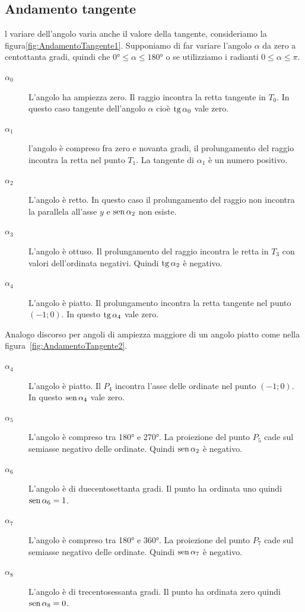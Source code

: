 \subsection{Andamento tangente}
\label{sec:AndamentoTangente}
l variare dell'angolo varia anche il valore della tangente, consideriamo la figura\nobs\vref{fig:AndamentoTangente1}. Supponiamo di far variare l'angolo $\alpha$ da zero a centottanta gradi, quindi che $\ang{0}\leq\alpha\leq\ang{180}$ o se utilizziamo i radianti $0\leq\alpha\leq\pi$. 
\begin{description}
	\item[$\alpha_0$] L'angolo ha ampiezza zero. Il raggio incontra la retta tangente in  $T_0$. In questo caso  tangente  dell'angolo $\alpha$ cioè $\operatorname{tg}\alpha_0$ vale zero.
	\item [$\alpha_1$] l'angolo è compreso fra zero e novanta gradi, il prolungamento del raggio  incontra la retta nel punto $T_1$. La tangente di $\alpha_1$ è un numero positivo.
	\item [$\alpha_2$] L'angolo  è retto. In questo caso il prolungamento del raggio non incontra la parallela all'asse $y$  e  $\operatorname{sen}\alpha_2$ non esiste. 
	\item [$\alpha_3$]  L'angolo è ottuso. Il prolungamento del raggio incontra le retta in $T_3$  con valori dell'ordinata negativi. Quindi $\operatorname{tg}\alpha_2$ è negativo.
	\item [$\alpha_4$] L'angolo  è  piatto. Il  prolungamento incontra la retta tangente  nel punto $(-1;0)$. In questo  $\operatorname{tg}\alpha_4$ vale zero.
\end{description}
Analogo discorso per angoli di ampiezza  maggiore di un angolo  piatto come nella figura~\vref{fig:AndamentoTangente2}.
\begin{description}
	\item [$\alpha_4$] L'angolo è piatto. Il  $P_4$ incontra l'asse delle ordinate nel punto $(-1;0)$. In questo  $\operatorname{sen}\alpha_4$ vale zero.
	\item [$\alpha_5$] L'angolo è compreso tra \ang{180} e \ang{270}. La proiezione del punto $P_5$ cade sul semiasse negativo delle ordinate. Quindi $\operatorname{sen}\alpha_2$ è negativo.
	\item [$\alpha_6$] L'angolo è di duecentosettanta gradi. Il punto ha ordinata uno quindi  $\operatorname{sen}\alpha_6=1$.
	\item [$\alpha_7$] L'angolo è compreso tra \ang{180} e \ang{360}. La proiezione del punto $P_7$ cade sul semiasse negativo delle ordinate. Quindi $\operatorname{sen}\alpha_7$ è negativo.
	\item [$\alpha_8$] L'angolo è di trecentosessanta gradi. Il punto ha ordinata zero quindi  $\operatorname{sen}\alpha_8=0$.
\end{description}
